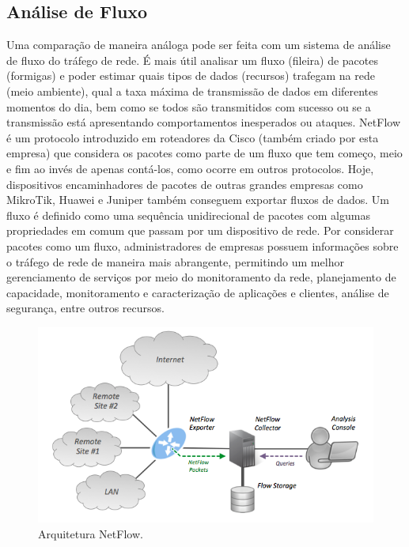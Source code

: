 \documentclass[twocolumn, letterpaper]{scrartcl}
\begin{document}
\subsection*{\color{triton_blue}Análise de Fluxo}

Uma comparação de maneira análoga pode ser feita com um sistema de análise de fluxo do tráfego de rede. É mais útil analisar um fluxo (fileira) de pacotes (formigas) e poder estimar quais tipos de dados (recursos) trafegam na rede (meio ambiente), qual a taxa máxima de transmissão de dados em diferentes momentos do dia, bem como se todos são transmitidos com sucesso ou se a transmissão está apresentando comportamentos inesperados ou ataques. NetFlow é um protocolo introduzido em roteadores da Cisco (também criado por esta empresa) que considera os pacotes como parte de um fluxo que tem começo, meio e fim ao invés de apenas contá-los, como ocorre em outros protocolos. Hoje, dispositivos encaminhadores de pacotes de outras grandes empresas como MikroTik, Huawei e Juniper também conseguem exportar fluxos de dados. Um fluxo é definido como uma sequência unidirecional de pacotes com algumas propriedades em comum que passam por um dispositivo de rede. Por considerar pacotes como um fluxo, administradores de empresas possuem informações sobre o tráfego de rede de maneira mais abrangente, permitindo um melhor gerenciamento de serviços por meio do monitoramento da rede, planejamento de capacidade, monitoramento e caracterização de aplicações e clientes, análise de segurança, entre outros recursos. 



\begin{figure}[!h]
	\includegraphics[width=\linewidth]{arquitetura_netflow.png}
	\caption{Arquitetura NetFlow. \label{arqnetflow}}
\end{figure}	
\end{document}
